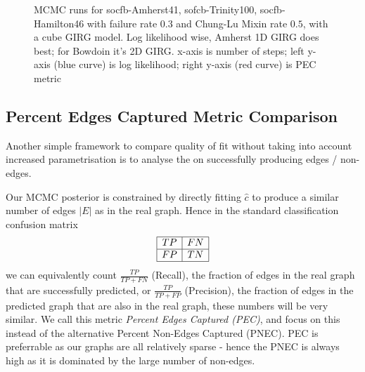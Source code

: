 \begin{figure}



  \caption{MCMC runs for socfb-Amherst41, sofcb-Trinity100, socfb-Hamilton46 with failure rate $0.3$ and Chung-Lu Mixin rate $0.5$, with a cube GIRG model. Log likelihood wise, Amherst 1D GIRG does best; for Bowdoin it's 2D GIRG.
  x-axis is number of steps; left y-axis (blue curve) is log likelihood; right y-axis (red curve) is PEC metric}
  \label{fig:mcmc_runs}
\end{figure}

\subsection{Percent Edges Captured Metric Comparison}
Another simple framework to compare quality of fit without taking into account increased parametrisation is to analyse the  on successfully producing edges / non-edges.

Our MCMC posterior is constrained by directly fitting $\hat{c}$ to produce a similar number of edges $|E|$ as in the real graph. Hence in the standard classification confusion matrix
\begin{equation}
  \begin{array}{|c|c|}
    \hline
    TP & FN \\
    \hline
    FP & TN \\
    \hline
    \end{array}
\end{equation}
we can equivalently count $\frac{TP}{TP + FN}$ (Recall), the fraction of edges in the real graph that are successfully predicted, or $\frac{TP}{TP + FP}$ (Precision), the fraction of edges in the predicted graph that are also in the real graph, these numbers will be very similar. We call this metric \textit{Percent Edges Captured (PEC)}, and focus on this instead of the alternative Percent Non-Edges Captured (PNEC). PEC is preferrable as our graphs are all relatively sparse - hence the PNEC is always high as it is dominated by the large number of non-edges.



